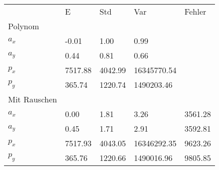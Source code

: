 \begin{tabular}{l|l|l|l|l}

         & E       & Std    & Var    & Fehler \\ 

\hhline{=|=|=|=|=}
Polynom & & & & \\ 

$a_x$  &        -0.01 &         1.00 &         0.99 & \\ 

$a_y$  &         0.44 &         0.81 &         0.66 & \\ 

$p_x$  &      7517.88 &      4042.99 &  16345770.54 & \\ 

$p_y$  &       365.74 &      1220.74 &   1490203.46 & \\ 

\hline 

Mit Rauschen & & & & \\ 

$a_x$  &         0.00 &         1.81 &         3.26 &      3561.28 \\ 

$a_y$  &         0.45 &         1.71 &         2.91 &      3592.81 \\ 

$p_x$  &      7517.93 &      4043.05 &  16346292.35 &      9623.26 \\ 

$p_y$  &       365.76 &      1220.66 &   1490016.96 &      9805.85 \\ 

\end{tabular}

